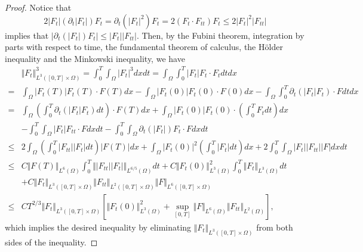 \documentclass[12pt,twoside,reqno]{amsart}
\numberwithin{equation}{section}
\theoremstyle{definition}
\theoremstyle{remark}
\begin{document}
\begin{proof} Notice that $$2{\vert{F_t}\vert}({\partial}_t{\vert{F_t}\vert})F_t={\partial}_t({\vert{F_t}\vert}^2)F_t=2(F_t\cdot F_{tt})F_t{\leqslant} 2{\vert{F_t}\vert}^2{\vert{F_{tt}}\vert}$$
implies that ${\vert{{\partial}_t({\vert{F_t}\vert})F_t}\vert}{\leqslant} {\vert{F_t}\vert}{\vert{F_{tt}}\vert}$. Then, by the Fubini theorem, integration by parts with respect to time, the fundamental theorem of calculus, the H\"older inequality and the Minkowski inequality, we have
  \begin{align*}
&{\Vert{F_t}\Vert}_{L^3([0,T]\times\Omega)}^3={\int_0^T\!\!\!\!\int_\Omega } {\vert{F_t}\vert}^3dxdt=\int_\Omega \int_0^T {\vert{F_t}\vert}F_t\cdot F_t dtdx\\
    =&\int_\Omega {\vert{F_t(T)}\vert}F_t(T)\cdot F(T)dx-\int_\Omega {\vert{F_t(0)}\vert}F_t(0)\cdot F(0)dx-\int_\Omega \int_0^T {\partial}_t({\vert{F_t}\vert}F_t)\cdot F dtdx\\
    =&\int_\Omega \left(\int_0^T{\partial}_t({\vert{F_t}\vert}F_t)dt\right)\cdot F(T)dx+\int_\Omega {\vert{F_t(0)}\vert}F_t(0)\cdot \left(\int_0^T F_t dt\right)dx\\
    &-{\int_0^T\!\!\!\!\int_\Omega } {\vert{F_t}\vert}F_{tt}\cdot F dxdt-{\int_0^T\!\!\!\!\int_\Omega } {\partial}_t({\vert{F_t}\vert}) F_t\cdot Fdxdt\\
    {\leqslant}& 2\int_\Omega \left(\int_0^T{\vert{F_{tt}}\vert}{\vert{F_t}\vert}dt\right) {\vert{F(T)}\vert}dx+\int_\Omega {\vert{F_t(0)}\vert}^2 \left(\int_0^T {\vert{F_t}\vert} dt\right)dx+2{\int_0^T\!\!\!\!\int_\Omega } {\vert{F_t}\vert}{\vert{F_{tt}}\vert}{\vert{F}\vert} dxdt\\
    {\leqslant}&C{\Vert{F(T)}\Vert}_{L^6(\Omega)}\int_0^T{\Vert{{\vert{F_{tt}}\vert}{\vert{F_t}\vert}}\Vert}_{L^{6/5}(\Omega)}dt +C{\Vert{F_t(0)}\Vert}_{L^3(\Omega)}^2\int_0^T{\Vert{F_t}\Vert}_{L^3(\Omega)}dt\\
    &+C{\Vert{F_t}\Vert}_{L^3([0,T]\times\Omega)}{\Vert{F_{tt}}\Vert}_{L^2([0,T] \times\Omega)} {\Vert{F}\Vert}_{L^6([0,T]\times\Omega)}\\
    {\leqslant} &CT^{2/3}{\Vert{F_t}\Vert}_{L^3([0,T]\times\Omega)}\left[ {\Vert{F_t(0)}\Vert}_{L^3(\Omega)}^2+ \sup_{[0,T]}{\Vert{F}\Vert}_{L^6(\Omega)} {\Vert{F_{tt}}\Vert}_{L^2(\Omega)}\right],
  \end{align*}
  which implies the desired inequality by eliminating ${\Vert{F_t}\Vert}_{L^3([0,T]\times\Omega)}$ from both sides of the inequality.
\end{proof}
\end{document}
